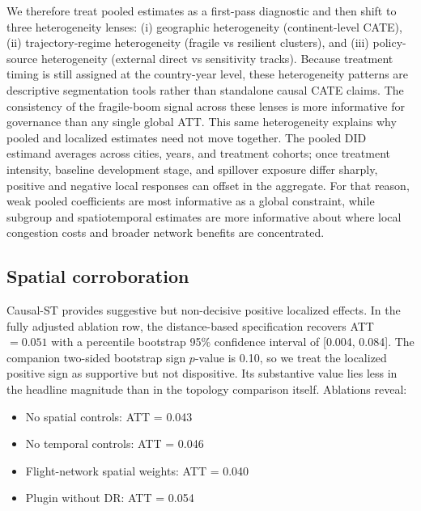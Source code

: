 \documentclass[11pt,a4paper]{article}
\begin{document}
We therefore treat pooled estimates as a first-pass diagnostic and then shift to three heterogeneity lenses:
(i) geographic heterogeneity (continent-level CATE),
(ii) trajectory-regime heterogeneity (fragile vs resilient clusters),
and (iii) policy-source heterogeneity (external direct vs sensitivity tracks).
Because treatment timing is still assigned at the country-year level, these heterogeneity patterns are descriptive segmentation tools rather than standalone causal CATE claims.
The consistency of the fragile-boom signal across these lenses is more informative for governance than any single global ATT.
This same heterogeneity explains why pooled and localized estimates need not move together.
The pooled DID estimand averages across cities, years, and treatment cohorts; once treatment intensity, baseline development stage, and spillover exposure differ sharply, positive and negative local responses can offset in the aggregate.
For that reason, weak pooled coefficients are most informative as a global constraint, while subgroup and spatiotemporal estimates are more informative about where local congestion costs and broader network benefits are concentrated.

\subsection{Spatial corroboration}
Causal-ST provides suggestive but non-decisive positive localized effects.
In the fully adjusted ablation row, the distance-based specification recovers ATT $=0.051$ with a percentile bootstrap 95\% confidence interval of [0.004, 0.084].
The companion two-sided bootstrap sign $p$-value is 0.10, so we treat the localized positive sign as supportive but not dispositive.
Its substantive value lies less in the headline magnitude than in the topology comparison itself.
Ablations reveal:
\begin{itemize}
  \item No spatial controls: ATT = 0.043
  \item No temporal controls: ATT = 0.046
  \item Flight-network spatial weights: ATT = 0.040
  \item Plugin without DR: ATT = 0.054
\end{itemize}
\end{document}
